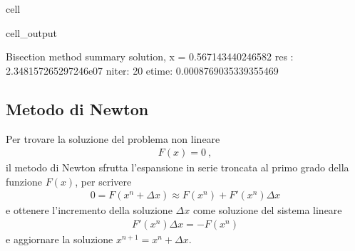 \documentclass[letterpaper,10pt,english]{jupyterBook}
\begin{document}
\begin{sphinxuseclass}{cell}
\begin{sphinxVerbatimOutput}
\begin{sphinxuseclass}{cell_output}
\begin{sphinxVerbatim}[commandchars=\\\{\}]
Bisection method summary
solution, x = \PYGZhy{}0.567143440246582
res  : \PYGZhy{}2.348157265297246e\PYGZhy{}07
niter: 20
etime: 0.0008769035339355469
\end{sphinxVerbatim}

\end{sphinxuseclass}\end{sphinxVerbatimOutput}

\end{sphinxuseclass}

\subsection{Metodo di Newton}
\label{\detokenize{ch/numerics/nonlinear:metodo-di-newton}}
\sphinxAtStartPar
Per trovare la soluzione del problema non lineare
\begin{equation*}
\begin{split}F(x) = 0 \ ,\end{split}
\end{equation*}
\sphinxAtStartPar
il metodo di Newton sfrutta l’espansione in serie troncata al primo grado della funzione \(F(x)\), per scrivere
\begin{equation*}
\begin{split}0 = F(x^n + \Delta x) \approx F(x^n) + F'(x^n) \Delta x \end{split}
\end{equation*}
\sphinxAtStartPar
e ottenere l’incremento della soluzione \(\Delta x\) come soluzione del sistema lineare
\begin{equation*}
\begin{split}F'(x^n) \Delta x = -F(x^n)\end{split}
\end{equation*}
\sphinxAtStartPar
e aggiornare la soluzione \(x^{n+1} = x^{n} + \Delta x\).
\end{document}
